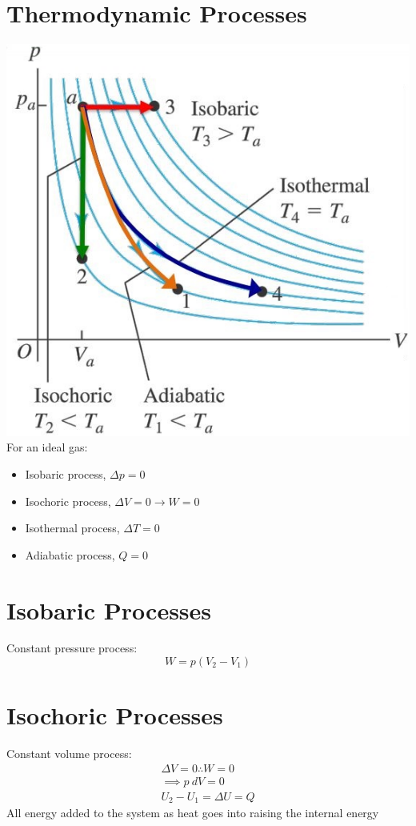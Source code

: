 \documentclass[a4paper, 11pt, normalem]{report}
\begin{document}
\section{Thermodynamic Processes}
\includegraphics[scale=0.7]{Processes.jpg} \\
For an ideal gas:
\begin{itemize}
	\item[] Isobaric process, ${\Delta}p = 0$
	\item[] Isochoric process, ${\Delta}V = 0 \rightarrow W = 0$
	\item[] Isothermal process, ${\Delta}T = 0$
	\item[] Adiabatic process, $Q = 0$
\end{itemize}

\section{Isobaric Processes}
Constant pressure process:
\begin{equation*}
	W = p(V_{2} - V_{1})
\end{equation*}

\section{Isochoric Processes}
Constant volume process:
\begin{gather*}
	{\Delta}V = 0 \therefore W = 0 \\
	\implies p\:dV = 0 \\
	U_{2} - U_{1} = {\Delta}U = Q
\end{gather*}
All energy added to the system as heat goes into raising the internal energy
\end{document}
